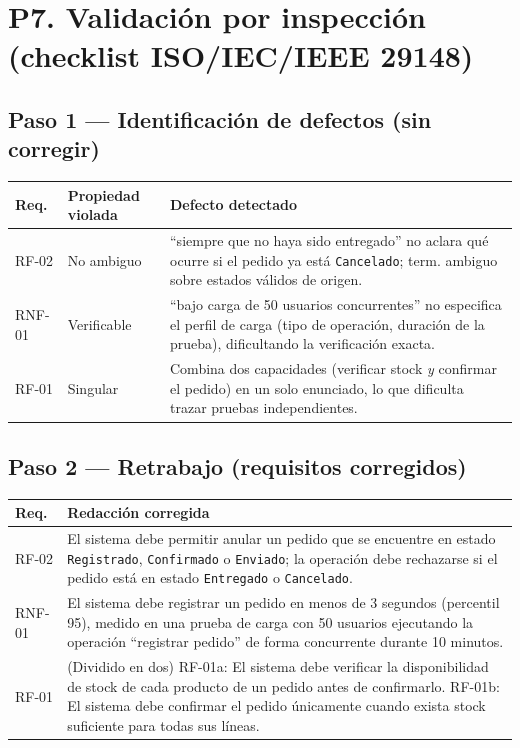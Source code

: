 \documentclass[11pt,letterpaper]{article}
\begin{document}
\section{P7. Validación por inspección (checklist ISO/IEC/IEEE 29148)}

\subsection*{Paso 1 --- Identificación de defectos (sin corregir)}
\begin{center}\small
\begin{tabular}{lp{2.2cm}p{7.8cm}}
\toprule
\textbf{Req.} & \textbf{Propiedad violada} & \textbf{Defecto detectado} \\
\midrule
RF-02 & No ambiguo & ``siempre que no haya sido entregado'' no aclara qué ocurre si el pedido ya está \texttt{Cancelado}; term. ambiguo sobre estados válidos de origen. \\
RNF-01 & Verificable & ``bajo carga de 50 usuarios concurrentes'' no especifica el perfil de carga (tipo de operación, duración de la prueba), dificultando la verificación exacta. \\
RF-01 & Singular & Combina dos capacidades (verificar stock \emph{y} confirmar el pedido) en un solo enunciado, lo que dificulta trazar pruebas independientes. \\
\bottomrule
\end{tabular}
\end{center}

\subsection*{Paso 2 --- Retrabajo (requisitos corregidos)}
\begin{center}\small
\begin{tabular}{lp{11cm}}
\toprule
\textbf{Req.} & \textbf{Redacción corregida} \\
\midrule
RF-02 & El sistema debe permitir anular un pedido que se encuentre en estado \texttt{Registrado}, \texttt{Confirmado} o \texttt{Enviado}; la operación debe rechazarse si el pedido está en estado \texttt{Entregado} o \texttt{Cancelado}. \\
RNF-01 & El sistema debe registrar un pedido en menos de 3 segundos (percentil 95), medido en una prueba de carga con 50 usuarios ejecutando la operación ``registrar pedido'' de forma concurrente durante 10 minutos. \\
RF-01 & (Dividido en dos) RF-01a: El sistema debe verificar la disponibilidad de stock de cada producto de un pedido antes de confirmarlo. RF-01b: El sistema debe confirmar el pedido únicamente cuando exista stock suficiente para todas sus líneas. \\
\bottomrule
\end{tabular}
\end{center}
\end{document}
